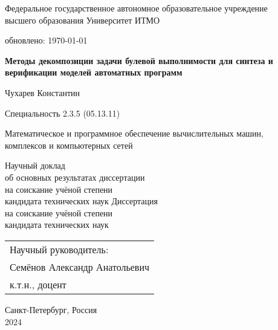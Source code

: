 \thispagestyle{empty}

\begin{center}
    Федеральное государственное автономное образовательное учреждение \\
    высшего образования Университет ИТМО

    {\tiny обновлено: \today}
\end{center}

\vspace{0pt plus2fill}

\begin{center}

\textbf{\large
Методы декомпозиции задачи булевой выполнимости для синтеза и верификации моделей автоматных программ
}

\vspace{1cm}

{\large
    Чухарев Константин
}

\vspace{1cm}

Специальность 2.3.5 (05.13.11)
\begin{SingleSpace*}
    \small
    Математическое и программное обеспечение вычислительных машин, \\
    комплексов и компьютерных сетей
\end{SingleSpace*}

\vspace{1cm}

\ifsynopsis
Научный доклад \\
об основных результатах диссертации \\
на соискание учёной степени \\
кандидата технических наук
\else
Диссертация \\
на соискание учёной степени \\
кандидата технических наук
\fi

\end{center}

\vspace{0pt plus1fill}

\hfill\begin{tabular}{l}
Научный руководитель: \\
Семёнов Александр Анатольевич \\
к.т.н., доцент
\end{tabular}

\vspace{0pt plus1fill}

\begin{center}
    Санкт-Петербург, Россия \\
    2024
\end{center}

